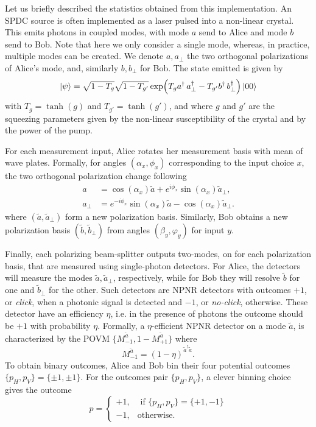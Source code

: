 \medbreak

Let us briefly described the statistics obtained from this implementation.
An SPDC source is often implemented as a laser pulsed into a non-linear crystal.
This emits photons in coupled modes, with mode $a$ send to Alice and mode $b$ send to Bob.
Note that here we only consider a single mode, whereas, in practice, multiple modes can be created.
We denote $a,a_\perp$ the two orthogonal polarizations of Alice's mode, and, similarly $b,b_\perp$ for Bob.
The state emitted is given by
\begin{equation}
	\ket{\psi} = \sqrt{1-T_g}\sqrt{1-T_{g'}}\exp(T_{g} a^\dag\,a^\dag_\perp - T_{g'}b^\dag\,b_\perp^\dag)\ket{00}
\end{equation}
with $T_g = \tanh(g)$ and $T_{g'} = \tanh(g')$, and where $g$ and $g'$ are the squeezing parameters given by the non-linear susceptibility of the crystal and by the power of the pump.

For each measurement input, Alice rotates her measurement basis with mean of wave plates.
Formally, for angles $(\alpha_x,\phi_x)$ corresponding to the input choice $x$, the two orthogonal polarization change following
\begin{equation}
	\begin{split}
		a &= \cos(\alpha_x)\tilde{a} + e^{i\phi_x}\sin(\alpha_x)\tilde{a}_\perp, \\
		a_\perp &= e^{-i\phi_x}\sin(\alpha_x)\tilde{a}-\cos(\alpha_x)\tilde{a}_\perp.
	\end{split}
\end{equation}
where $(\tilde{a},\tilde{a}_\perp)$ form a new polarization basis.
Similarly, Bob obtains a new polarization basis $(\tilde{b},\tilde{b}_\perp)$ from angles $(\beta_y,\varphi_y)$ for input $y$.

Finally, each polarizing beam-splitter outputs two-modes, on for each polarization basis, that are measured using single-photon detectors.
For Alice, the detectors will measure the modes $\tilde{a},\tilde{a}_\perp$, respectively, while for Bob they will resolve $\tilde{b}$ for one and $\tilde{b}_\perp$ for the other.
Such detectors are \acrfull{NPNR} detectors with outcomes $+1$, or \textit{click}, when a photonic signal is detected and $-1$, or \textit{no-click}, otherwise.
These detector have an efficiency $\eta$, i.e. in the presence of photons the outcome should be $+1$ with probability $\eta$.
Formally, a $\eta$-efficient NPNR detector on a mode $\tilde{a}$, is characterized by the POVM $\{M_{-1}^{\tilde{a}},1-M_{+1}^{\tilde{a}}\}$ where
\begin{equation}
	M_{-1}^{\tilde{a}} = (1-\eta)^{\tilde{a}^\dag\tilde{a}}.
\end{equation}
To obtain binary outcomes, Alice and Bob bin their four potential outcomes $\{p_H,p_V\}=\{\pm1,\pm1\}$.
For the outcomes pair $\{p_H,p_V\}$, a clever binning choice gives the outcome
\begin{equation}
	p=\begin{cases}
		+1, &\text{ if } \{p_H,p_V\}=\{+1,-1\}\\
		-1, &\text{otherwise}.
	\end{cases}
\end{equation}

